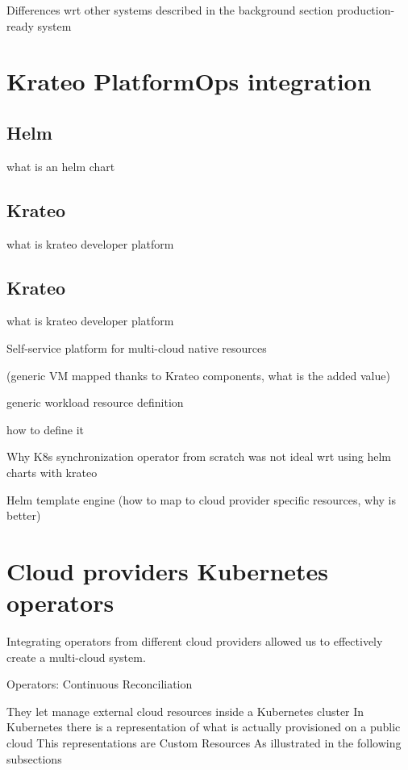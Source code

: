 Differences wrt other systems described in the background section
production-ready system





\section{Krateo PlatformOps integration}

\subsection{Helm}
what is an helm chart


\subsection{Krateo}
what is krateo
developer platform


\subsection{Krateo}
what is krateo
developer platform


Self-service platform for multi-cloud native resources



(generic VM mapped thanks to Krateo components, what is the added value)




generic workload resource definition



how to define it

Why K8s synchronization operator from scratch was not ideal wrt using helm charts with krateo

Helm template engine (how to map to cloud provider specific resources, why is better)


\section{Cloud providers Kubernetes operators}

Integrating operators from different cloud providers allowed us to effectively create a multi-cloud system.




Operators:
Continuous Reconciliation

They let manage external cloud resources inside a Kubernetes cluster
In Kubernetes there is a representation of what is actually provisioned on a public cloud
This representations are Custom Resources
As illustrated in the following subsections



